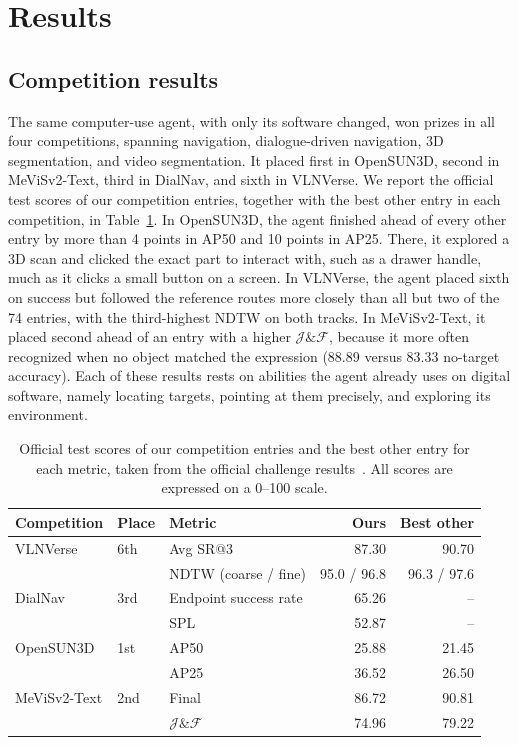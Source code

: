 \documentclass{article}
\begin{document}
\section{Results}
\label{sec:results}

\subsection{Competition results}

The same computer-use agent, with only its software changed, won prizes in all four competitions, spanning navigation, dialogue-driven navigation, 3D segmentation, and video segmentation. It placed first in OpenSUN3D, second in MeViSv2-Text, third in DialNav, and sixth in VLNVerse. We report the official test scores of our competition entries, together with the best other entry in each competition, in Table~\ref{tab:competition-results}. In OpenSUN3D, the agent finished ahead of every other entry by more than 4 points in AP50 and 10 points in AP25. There, it explored a 3D scan and clicked the exact part to interact with, such as a drawer handle, much as it clicks a small button on a screen. In VLNVerse, the agent placed sixth on success but followed the reference routes more closely than all but two of the 74 entries, with the third-highest NDTW on both tracks. In MeViSv2-Text, it placed second ahead of an entry with a higher $\mathcal{J}\&\mathcal{F}$, because it more often recognized when no object matched the expression (88.89 versus 83.33 no-target accuracy). Each of these results rests on abilities the agent already uses on digital software, namely locating targets, pointing at them precisely, and exploring its environment.

\begin{table}[!ht]
    \centering
    \caption{Official test scores of our competition entries and the best other entry for each metric, taken from the official challenge results~\citep{emr2026,ead2026,opensun3d2026,liu2026lsvos}. All scores are expressed on a 0--100 scale.}
    \label{tab:competition-results}
    \begin{tabular}{@{}lllrr@{}}
        \toprule
        Competition & Place & Metric & Ours & Best other \\
        \midrule
        VLNVerse & 6th & Avg SR@3 & 87.30 & 90.70 \\
                 &     & NDTW (coarse / fine) & 95.0 / 96.8 & 96.3 / 97.6 \\
        DialNav & 3rd & Endpoint success rate & 65.26 & -- \\
                &     & SPL & 52.87 & -- \\
        OpenSUN3D & 1st & AP50 & 25.88 & 21.45 \\
                  &     & AP25 & 36.52 & 26.50 \\
        MeViSv2-Text & 2nd & Final & 86.72 & 90.81 \\
                     &     & $\mathcal{J}\&\mathcal{F}$ & 74.96 & 79.22 \\
        \bottomrule
    \end{tabular}
\end{table}
\end{document}
